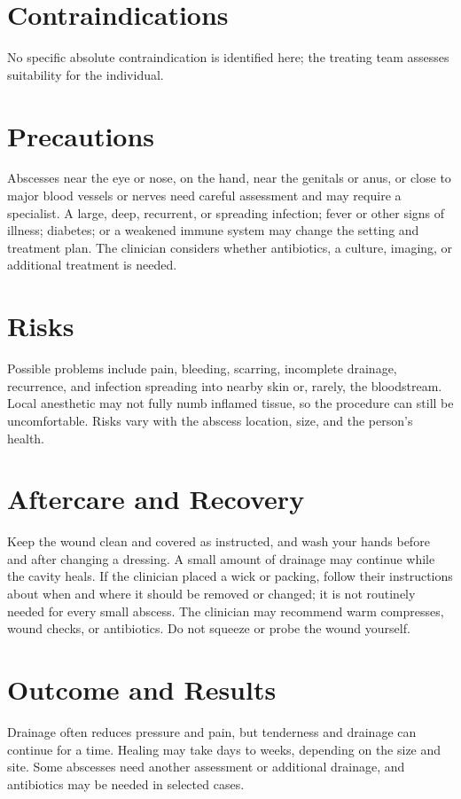 \section*{Contraindications}
No specific absolute contraindication is identified here; the treating team assesses suitability for the individual.

\section*{Precautions}
Abscesses near the eye or nose, on the hand, near the genitals or anus, or close to major blood vessels or nerves need careful assessment and may require a specialist. A large, deep, recurrent, or spreading infection; fever or other signs of illness; diabetes; or a weakened immune system may change the setting and treatment plan. The clinician considers whether antibiotics, a culture, imaging, or additional treatment is needed.

\section*{Risks}
Possible problems include pain, bleeding, scarring, incomplete drainage, recurrence, and infection spreading into nearby skin or, rarely, the bloodstream. Local anesthetic may not fully numb inflamed tissue, so the procedure can still be uncomfortable. Risks vary with the abscess location, size, and the person's health.

\section*{Aftercare and Recovery}
Keep the wound clean and covered as instructed, and wash your hands before and after changing a dressing. A small amount of drainage may continue while the cavity heals. If the clinician placed a wick or packing, follow their instructions about when and where it should be removed or changed; it is not routinely needed for every small abscess. The clinician may recommend warm compresses, wound checks, or antibiotics. Do not squeeze or probe the wound yourself.

\section*{Outcome and Results}
Drainage often reduces pressure and pain, but tenderness and drainage can continue for a time. Healing may take days to weeks, depending on the size and site. Some abscesses need another assessment or additional drainage, and antibiotics may be needed in selected cases.

